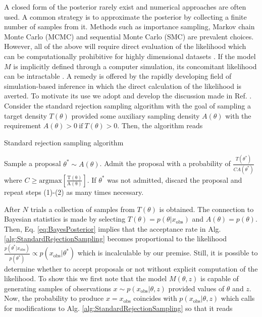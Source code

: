 \documentclass[%
 reprint,
 amsmath,amssymb,
 aps,
]{revtex4-2}
\begin{document}
A closed form of the posterior rarely exist and numerical approaches are often used. A common strategy is to approximate the posterior by collecting a finite number of samples from it. Methods such as importance sampling, Markov chain Monte Carlo (MCMC) and sequential Monte Carlo (SMC) \cite{tokdar2010importance,doucet2001introduction,brooks2011handbook} are prevalent choices. However, all of the above will require direct evaluation of the likelihood which can be computationally prohibitive for highly dimensional datasets \cite{sisson2018handbook}. If the model $M$ is implicitly defined through a computer simulation, its concomitant likelihood can be intractable \cite{brehmer2020mining}. A remedy is offered by the rapidly developing field of simulation-based inference \cite{cranmer2020frontier} in which the direct calculation of the likelihood is averted. To motivate its use we adopt and develop the discussion made in Ref. \cite{sisson2018handbook}. \\ 

Consider the standard rejection sampling algorithm with the goal of sampling a target density $T(\theta)$ provided some auxiliary sampling density $A(\theta)$ with the requirement $A(\theta) > 0 \  \mathrm{if} \  T(\theta) > 0$. Then, the algorithm reads
\begin{algorithm}[H] 
\caption{Standard rejection sampling algorithm}
\label{alg:StandardRejectionSampling} 
\begin{algorithmic}[1]
\State Sample a proposal $\theta^* \sim A(\theta)$.
\State Admit the proposal with a probability of $\frac{T(\theta^*)}{C A(\theta^*)}$ where $C \geq \mathrm{argmax[\frac{T(\theta)}{A(\theta)}]}$.
\State If $\theta^*$ was not admitted, discard the proposal and repeat steps (1)-(2) as many times necessary.
\end{algorithmic}
\end{algorithm}
After $N$ trials a collection of samples from $T(\theta)$ is obtained. The connection to Bayesian statistics is made by selecting
$T(\theta) = p(\theta | x_{\text{obs}})$ and $A(\theta)=p(\theta)$. Then, Eq. \eqref{eq:BayesPosterior} implies that the acceptance rate in Alg. \ref{alg:StandardRejectionSampling} becomes proportional to the likelihood $\frac{p(\theta^* \lvert x_{\text{obs}})}{p(\theta^*)} \propto p(x_{\text{obs}} | \theta^*)$ which is incalculable by our premise. Still, it is possible to determine whether to accept proposals or not without explicit computation of the likelihood. To show this we first note that the model $M(\theta,z)$ is capable of generating samples of observations $x \sim p(x_{\text{obs}}|\theta, z)$ provided values of $\theta$ and $z$. Now, the probability to produce $x = x_{\text{obs}}$ coincides with $p(x_{\text{obs}}|\theta, z)$ which calls for modifications to Alg. \ref{alg:StandardRejectionSampling} so that it reads
\end{document}

